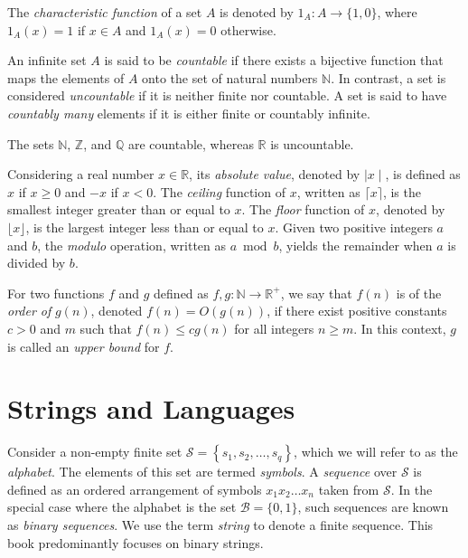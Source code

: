 The \emph{characteristic function} of a set $A$ is denoted by $1_A : A \rightarrow \{1, 0\}$, where $1_A(x) = 1$ if $x \in A$ and $1_A(x) = 0$ otherwise.

An infinite set $A$ is said to be \emph{countable} if there exists a bijective function that maps the elements of $A$ onto the set of natural numbers $\mathbb{N}$. In contrast, a set is considered \emph{uncountable} if it is neither finite nor countable. A set is said to have \emph{countably many} elements if it is either finite or countably infinite.

\begin{example}
The sets $\mathbb{N}$, $\mathbb{Z}$, and $\mathbb{Q}$ are countable, whereas $\mathbb{R}$ is uncountable.
\end{example}

Considering a real number $x \in \mathbb{R}$, its \emph{absolute value}, denoted by $\mid x \mid$, is defined as $x$ if $x \geq 0$ and $-x$ if $x < 0$. The \emph{ceiling} function of $x$, written as $\lceil x \rceil$, is the smallest integer greater than or equal to $x$. The \emph{floor} function of $x$, denoted by $\lfloor x \rfloor$, is the largest integer less than or equal to $x$. Given two positive integers $a$ and $b$, the \emph{modulo} operation, written as $a \bmod b$, yields the remainder when $a$ is divided by $b$.

For two functions $f$ and $g$ defined as $f, g : \mathbb{N} \rightarrow \mathbb{R}^{+}$, we say that $f(n)$ is of the \emph{order of} $g(n)$, denoted $f(n) = O(g(n))$, if there exist positive constants $c > 0$ and $m$ such that $f(n) \leq c g(n)$ for all integers $n \geq m$. In this context, $g$ is called an \emph{upper bound} for $f$.

%
%

\section{Strings and Languages}
\label{sec:strings}

Consider a non-empty finite set $\mathcal{S}=\left\{ s_{1},s_{2},\ldots,s_{q}\right\}$, which we will refer to as the \emph{alphabet}. The elements of this set are termed \emph{symbols}. A \emph{sequence} over $\mathcal{S}$ is defined as an ordered arrangement of symbols $x_1 x_2 \dots x_n$ taken from $\mathcal{S}$. In the special case where the alphabet is the set $\mathcal{B} = \{0, 1\}$, such sequences are known as \emph{binary sequences}. We use the term \emph{string} to denote a finite sequence. This book predominantly focuses on binary strings. 

